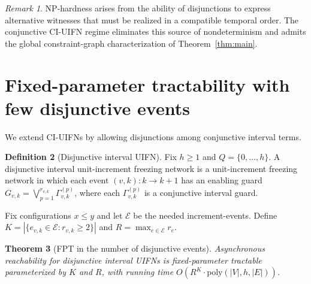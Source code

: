 \documentclass[final,3p,times]{elsarticle}
\newtheorem{theorem}{Theorem}
\theoremstyle{definition}
\newtheorem{definition}[theorem]{Definition}
\theoremstyle{remark}
\newtheorem{remark}[theorem]{Remark}
\newcommand{\cE}{\mathcal{E}}
\begin{document}
\begin{remark}
NP-hardness arises from the ability of disjunctions to express alternative witnesses that must be realized in a compatible temporal order.
The conjunctive CI-UIFN regime eliminates this source of nondeterminism and admits the global constraint-graph characterization of Theorem~\ref{thm:main}.
\end{remark}

\section{Fixed-parameter tractability with few disjunctive events}

We extend CI-UIFNs by allowing disjunctions among conjunctive interval terms.

\begin{definition}[Disjunctive interval UIFN]
Fix $h\ge 1$ and $Q=\{0,\dots,h\}$.
A disjunctive interval unit-increment freezing network is a unit-increment freezing network in which each event $(v,k)\colon k\to k{+}1$ has an enabling guard $G_{v,k}=\bigvee_{p=1}^{r_{v,k}}\Gamma_{v,k}^{(p)}$, where each $\Gamma_{v,k}^{(p)}$ is a conjunctive interval guard.
\end{definition}

Fix configurations $x\le y$ and let $\cE$ be the needed increment-events.
Define $K=|\{e_{v,k}\in\cE:r_{v,k}\ge 2\}|$ and $R=\max_{e\in\cE}r_e$.

\begin{theorem}[FPT in the number of disjunctive events]\label{thm:fpt}
Asynchronous reachability for disjunctive interval UIFNs is fixed-parameter tractable parameterized by $K$ and $R$, with running time $O(R^K\cdot\mathrm{poly}(|V|,h,|E|))$.
\end{theorem}
\end{document}
